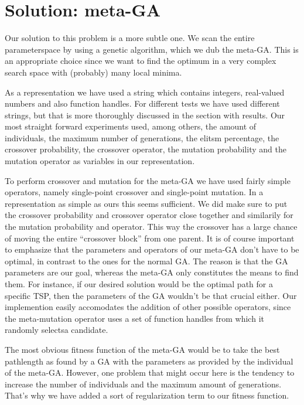 \documentclass[a4paper]{article}
\begin{document}
\section{Solution: meta-GA}

Our solution to this problem is a more subtle one. We scan the entire parameterspace by using a genetic algorithm, which we dub the meta-GA. This is an appropriate choice since we want to find the optimum in a very complex search space with (probably) many local minima. 
\par
As a representation we have used a string which contains integers, real-valued numbers and also function handles. For different tests we have used different strings, but that is more thoroughly discussed in the section with results. Our most straight forward experiments used, among others, the amount of individuals, the maximum number of generations, the elitsm percentage, the crossover probability, the crossover operator, the mutation probability  and the mutation operator as variables in our representation.
\par
To perform crossover and mutation for the meta-GA we have used fairly simple operators, namely single-point crossover and single-point mutation. In a representation as simple as ours this seems sufficient. We did make sure to put the crossover probability and crossover operator close together and similarily for the mutation probability and operator. This way the crossover has a large chance of moving the entire ``crossover block'' from one parent. It is of course important to emphasize that the parameters and operators of our meta-GA don't have to be optimal, in contrast to the ones for the normal GA. The reason is that the GA parameters are our goal, whereas the meta-GA only constitutes the means to find them. For instance, if our desired solution would be the optimal path for a specific TSP, then the parameters of the GA wouldn't be that crucial either. Our implemention easily accomodates the addition of other possible operators, since the meta-mutation operator uses a set of function handles from which it randomly selectsa candidate.
\par
The most obvious fitness function of the meta-GA would be to take the best pathlength as found by a GA with the parameters as provided by the individual of the meta-GA. However, one problem that might occur here is the tendency to increase the number of individuals and the maximum amount of generations. That's why we have added a sort of regularization term to our fitness function.
\end{document}
